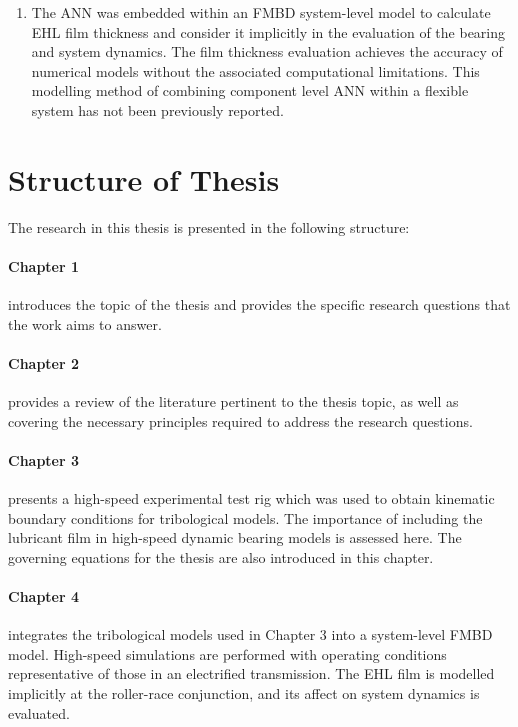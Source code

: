 \begin{enumerate}
	\item The ANN was embedded within an FMBD system-level model to calculate EHL film thickness and consider it implicitly in the evaluation of the bearing and system dynamics. The film thickness evaluation achieves the accuracy of numerical models without the associated computational limitations. This modelling method of combining component level ANN within a flexible system has not been previously reported.
\end{enumerate}

\section{Structure of Thesis} \label{Structure of Thesis}

The research in this thesis is presented in the following structure:

\paragraph{Chapter 1} introduces the topic of the thesis and provides the specific research questions that the work aims to answer.

\paragraph{Chapter 2} provides a review of the literature pertinent to the thesis topic, as well as covering the necessary principles required to address the research questions.

\paragraph{Chapter 3} presents a high-speed experimental test rig which was used to obtain kinematic boundary conditions for tribological models. The importance of including the lubricant film in high-speed dynamic bearing models is assessed here. The governing equations for the thesis are also introduced in this chapter.

\paragraph{Chapter 4} integrates the tribological models used in Chapter 3 into a system-level FMBD model. High-speed simulations are performed with operating conditions representative of those in an electrified transmission. The EHL film is modelled implicitly at the roller-race conjunction, and its affect on system dynamics is evaluated.

